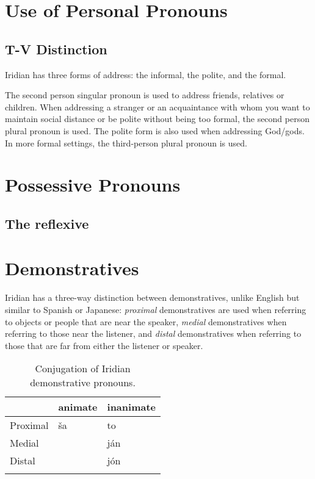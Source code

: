 \section{Use of Personal Pronouns}

\subsection{T-V Distinction}

Iridian has three forms of address: the informal, the polite, and the formal.

The second person singular pronoun  is used to address friends, relatives or children. When addressing a stranger or an acquaintance with whom you want to maintain social distance or be polite without being too formal, the second person plural pronoun  is used. The polite form is also used when addressing God/gods. In more formal settings, the third-person plural pronoun  is used.



\section{Possessive Pronouns}

\subsection{The reflexive }

\section{Demonstratives}

Iridian has a three-way distinction between demonstratives, unlike English but similar to Spanish or Japanese: \emph{proximal} demonstratives are used when referring to objects or people that are near the speaker, \emph{medial} demonstratives when referring to those near the listener, and \emph{distal} demonstratives when referring to those that are far from either the listener or speaker.






\begin{table}[h!]
	\small\centering
	\caption{Conjugation of Iridian demonstrative pronouns.}
	\begin{tabu}to 0.7\textwidth{YMM}
		\toprule
						& {\sc animate}		& {\sc inanimate}\\
		\midrule
		Proximal		& ša			& to\\ \addlinespace
		Medial			&&ján\\ \addlinespace
		Distal			&&j\'on\\ \addlinespace
		\bottomrule
	\end{tabu}
\end{table}

